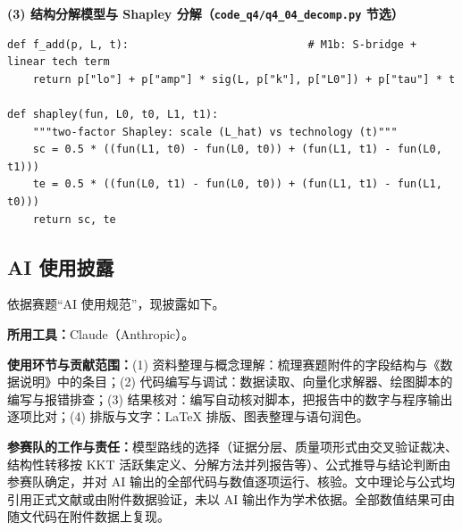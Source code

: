 \textbf{(3) 结构分解模型与 Shapley 分解（\texttt{code\_q4/q4\_04\_decomp.py} 节选）}
\begin{lstlisting}
def f_add(p, L, t):                            # M1b: S-bridge + linear tech term
    return p["lo"] + p["amp"] * sig(L, p["k"], p["L0"]) + p["tau"] * t

def shapley(fun, L0, t0, L1, t1):
    """two-factor Shapley: scale (L_hat) vs technology (t)"""
    sc = 0.5 * ((fun(L1, t0) - fun(L0, t0)) + (fun(L1, t1) - fun(L0, t1)))
    te = 0.5 * ((fun(L0, t1) - fun(L0, t0)) + (fun(L1, t1) - fun(L1, t0)))
    return sc, te
\end{lstlisting}

\subsection{AI 使用披露}

依据赛题“AI 使用规范”，现披露如下。

\textbf{所用工具：}Claude（Anthropic）。

\textbf{使用环节与贡献范围：}(1) 资料整理与概念理解：梳理赛题附件的字段结构与《数据说明》中的条目；(2) 代码编写与调试：数据读取、向量化求解器、绘图脚本的编写与报错排查；(3) 结果核对：编写自动核对脚本，把报告中的数字与程序输出逐项比对；(4) 排版与文字：LaTeX 排版、图表整理与语句润色。

\textbf{参赛队的工作与责任：}模型路线的选择（证据分层、质量项形式由交叉验证裁决、结构性转移按 KKT 活跃集定义、分解方法并列报告等）、公式推导与结论判断由参赛队确定，并对 AI 输出的全部代码与数值逐项运行、核验。文中理论与公式均引用正式文献或由附件数据验证，未以 AI 输出作为学术依据。全部数值结果可由随文代码在附件数据上复现。
